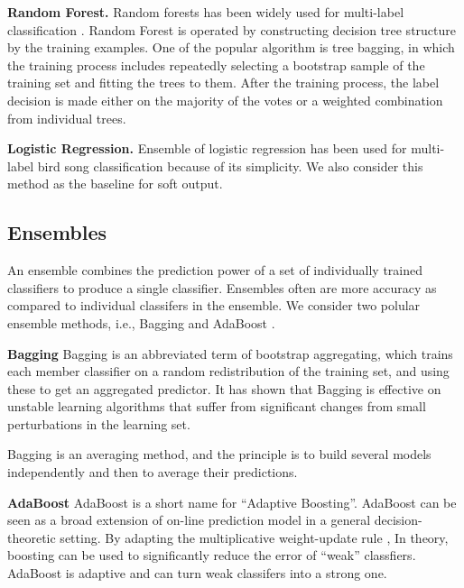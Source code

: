 \documentclass[12pt,peerreview,letterpaper]{IEEEtran}
\begin{document}

\textbf{Random Forest.} Random forests has been widely used for multi-label classification \cite{Lasseck13, chennovel13, Stowell_NIPSW13, Zhang_SDM2010}.
Random Forest is operated by constructing decision tree structure by the training examples. One of the popular algorithm is tree bagging, in which the training process includes repeatedly selecting a bootstrap sample of the training set and  fitting the trees to them. After the training process, the label decision is made either on the majority of the votes or a weighted combination from individual trees.


\textbf{Logistic Regression.} Ensemble of logistic regression has been used for multi-label bird song classification \cite{Massaron13} because of its simplicity. We also consider this method as the baseline for soft output.

\subsection{Ensembles}

An ensemble combines the prediction power of a set of individually trained classifiers to produce a single classifier. Ensembles often are more accuracy as compared to individual classifers in the ensemble. We consider two polular ensemble methods, i.e., Bagging \cite{breiman1996bagging} and AdaBoost \cite{freund1997decision}.

\textbf{Bagging} Bagging is an abbreviated term of bootstrap aggregating, which trains each member classifier on a random redistribution of the training set, and using these to get
an aggregated predictor. It has shown that Bagging is effective on unstable learning algorithms that suffer from significant changes from small perturbations in the learning set.

Bagging is an averaging method, and the principle is to build several models independently and then to average their predictions.

\textbf{AdaBoost} AdaBoost is a short name for ``Adaptive Boosting''. AdaBoost can be seen as a broad extension of on-line prediction model in a general decision-theoretic setting. By adapting the multiplicative weight-update rule \cite{littlestone1994weighted}, In theory, boosting can be used to significantly reduce the error of ``weak'' classfiers. AdaBoost is adaptive and can turn weak classifers into a strong one.
\end{document}
